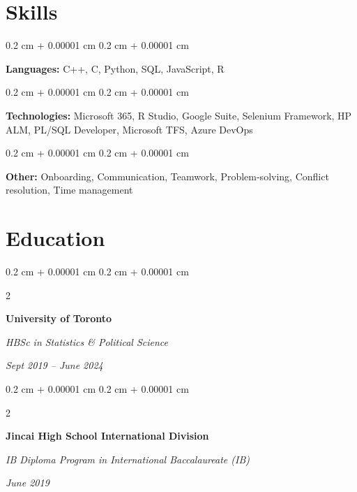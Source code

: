 \documentclass[10pt, letterpaper]{article}
\newenvironment{onecolentry}{
    \begin{adjustwidth}{
        0.2 cm + 0.00001 cm
    }{
        0.2 cm + 0.00001 cm
    }
}{
    \end{adjustwidth}
} %
\newenvironment{twocolentry}[2][]{
    \onecolentry
    \def\secondColumn{#2}
    \setcolumnwidth{\fill, 4.5 cm}
    \begin{paracol}{2}
}{
    \switchcolumn \raggedleft \secondColumn
    \end{paracol}
    \endonecolentry
} %
\begin{document}
    
    \section{Skills}



        
        \begin{onecolentry}
            \textbf{Languages:} C++, C, Python, SQL, JavaScript, R
        \end{onecolentry}

        \vspace{0.2 cm}

        \begin{onecolentry}
            \textbf{Technologies:} Microsoft 365, R Studio, Google Suite, Selenium Framework, HP ALM, PL/SQL Developer, Microsoft TFS, Azure DevOps
        \end{onecolentry}

        \vspace{0.2 cm}

        \begin{onecolentry}
            \textbf{Other:} Onboarding, Communication, Teamwork, Problem-solving, Conflict resolution, Time management
        \end{onecolentry}


    
    \section{Education}



        
        \begin{twocolentry}{
            
            
        \textit{Sept 2019 – June 2024}}
            \textbf{University of Toronto}

            \textit{HBSc in Statistics \& Political Science}
        \end{twocolentry}



        \vspace{0.2 cm}

        \begin{twocolentry}{
            
            
        \textit{June 2019}}
            \textbf{Jincai High School International Division}

            \textit{IB Diploma Program in International Baccalaureate (IB)}
        \end{twocolentry}
\end{document}
